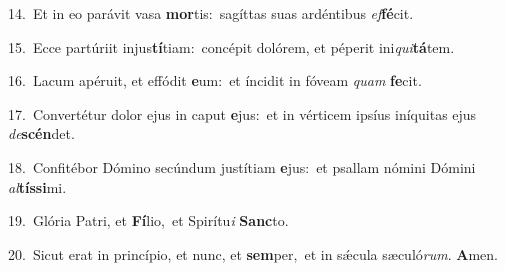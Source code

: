 {\numbfont\textcolor{\numbcolor}{14.}}~Et in eo parávit vasa \textbf{mor}\-tis:~\star sagíttas suas ardéntibus \textit{ef}\-\textbf{fé}cit.\par
{\numbfont\textcolor{\numbcolor}{15.}}~Ecce partúriit injus\-\textbf{tí}\-tiam:~\star concépit dolórem, et péperit ini\-\textit{qui}\-\textbf{tá}tem.\par
{\numbfont\textcolor{\numbcolor}{16.}}~Lacum apéruit, et effódit \textbf{e}\-um:~\star et íncidit in fóveam \textit{quam} \textbf{fe}\-cit.\par
{\numbfont\textcolor{\numbcolor}{17.}}~Convertétur dolor ejus in caput \textbf{e}\-jus:~\star et in vérticem ipsíus iníquitas ejus \textit{de}\-\textbf{scén}det.\par
{\numbfont\textcolor{\numbcolor}{18.}}~Confitébor Dómino secúndum justítiam \textbf{e}\-jus:~\star et psallam nómini Dómini \textit{al}\-\textbf{tís}\textbf{si}mi.\par
{\numbfont\textcolor{\numbcolor}{19.}}~Glória Patri, et \textbf{Fí}\-lio,~\star et Spirítu\textit{i} \textbf{Sanc}\-to.\par
{\numbfont\textcolor{\numbcolor}{20.}}~Sicut erat in princípio, et nunc, et \textbf{sem}\-per,~\star et in sǽcula sæculó\-\textit{rum}\-. \textbf{A}\-men.\par
